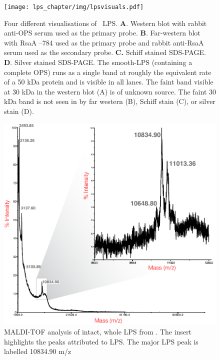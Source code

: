       \begin{figure}[htp]
        \begin{center}
          \texttt{[image: lps\_chapter/img/lpsvisuals.pdf]}
        \end{center}
        \caption[Four different visualisations of \caulobacter\ \ac{LPS}]{Four different visualisations
          of \caulobacter\ \ac{LPS}. \textbf{A}. Western blot with rabbit anti-\ac{OPS} serum used as
          the primary probe. \textbf{B}. Far-western blot with RsaA --784 used as the primary
          probe and rabbit anti-RsaA serum used as the secondary probe. \textbf{C.} Schiff stained
          \ac{SDS-PAGE}. \textbf{D}. Silver stained \ac{SDS-PAGE}. The smooth-\ac{LPS} (\ie containing a
          complete \ac{OPS}) runs as a single band at roughly the equivalent rate of a 50 kDa protein
          and is visible in all lanes. The faint band visible at 30 kDa in the western blot (A) is of
          unknown source. The faint 30 kDa band is not seen in by far western (B), Schiff stain (C), or
          silver stain (D).}
        \label{fig:lpsvisuals}
      \end{figure}

      \begin{figure}[htb]
        \begin{center}
          \includegraphics[]{lps_chapter/img/malditof.pdf}
        \end{center}
        \caption[\Ac{MALDI-TOF} analysis of intact, whole \ac{LPS} from \caulobacter]{\ac{MALDI-TOF}
          analysis of intact, whole \ac{LPS} from \caulobacter. The insert highlights the peaks
          attributed to \ac{LPS}. The major \ac{LPS} peak is labelled 10834.90 m/z}
        \label{fig:lpsmalditof}
      \end{figure}

